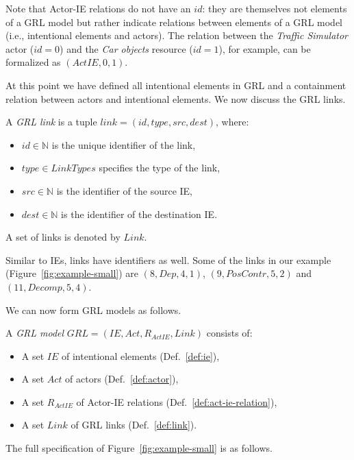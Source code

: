 Note that Actor-IE relations do not have an $id$: they are themselves not elements of a GRL model but rather indicate relations between elements of a GRL model (i.e., intentional elements and actors). The relation between the \emph{Traffic Simulator} actor ($id = 0$) and the \emph{Car objects} resource ($id=1$), for example, can be formalized as $(ActIE, 0, 1)$.

At this point we have defined all intentional elements in GRL and a containment relation between actors and intentional elements. We now discuss the GRL links.

\begin{definition}
\label{def:link}
A \emph{GRL link} is a tuple $link = (id,type,src,dest)$, where:
\begin{itemize}
\item $id\in \mathbb{N}$ is the unique identifier of the link,
\item $type\in LinkTypes$ specifies the type of the link, 
\item $src\in \mathbb{N}$ is the identifier of the source IE,
\item $dest\in \mathbb{N}$ is the identifier of the destination IE.
\end{itemize}

A set of links is denoted by $Link$.
\end{definition}

Similar to IEs, links have identifiers as well. Some of the links in our example (Figure~\ref{fig:example-small}) are $(8, Dep, 4, 1)$, $(9, PosContr, 5, 2)$ and $(11, Decomp, 5, 4)$.

We can now form GRL models as follows.

\begin{definition}
\label{def:grl-model}
A \emph{GRL model} $GRL=(IE, Act, R_{ActIE}, Link)$ consists of:
\begin{itemize}
\item A set $IE$ of intentional elements (Def.~\ref{def:ie}),
\item A set $Act$ of actors (Def.~\ref{def:actor}),
\item A set $R_{ActIE}$ of Actor-IE relations (Def.~\ref{def:act-ie-relation}),
\item A set $Link$ of GRL links (Def.~\ref{def:link}).
\end{itemize}
\end{definition}

The full specification of Figure~\ref{fig:example-small} is as follows. 

